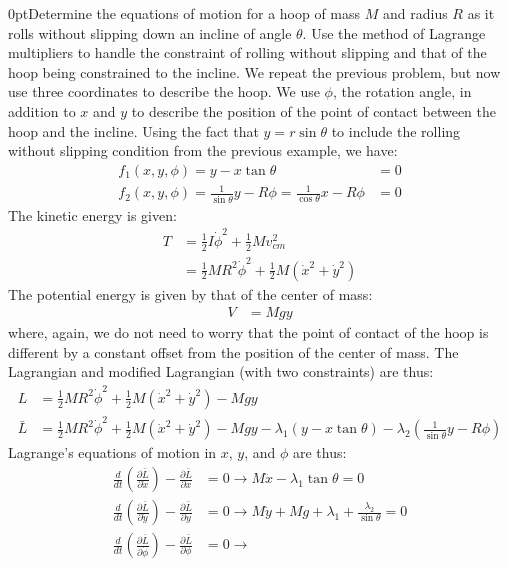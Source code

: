 \begin{example}{0pt}{Determine the equations of motion for a hoop of mass $M$ and radius $R$ as it rolls without slipping down an incline of angle $\theta$. Use the method of Lagrange multipliers to handle the constraint of rolling without slipping and that of the hoop being constrained to the incline.}{}
We repeat the previous problem, but now use three coordinates to describe the hoop. We use $\phi$, the rotation angle, in addition to $x$ and $y$ to describe the position of the point of contact between the hoop and the incline. Using the fact that $y=r\sin{\theta}$ to include the rolling without slipping condition from the previous example, we have:
\begin{align*}
f_1(x,y,\phi)=y-x\tan{\theta}&=0\\
f_2(x,y,\phi)=\frac{1}{\sin{\theta}}y-R\phi=\frac{1}{\cos{\theta}}x-R\phi&=0
\end{align*}
The kinetic energy is given:
\begin{align*}
T&=\frac{1}{2}I\dot{\phi}^2+\frac{1}{2}Mv_{cm}^2\\
&=\frac{1}{2}MR^2\dot{\phi}^2+\frac{1}{2}M(\dot{x}^2+\dot{y}^2)
\end{align*}
The potential energy is given by that of the center of mass:
\begin{align*}
V&=Mgy
\end{align*}
where, again, we do not need to worry that the point of contact of the hoop is different by a constant offset from the position of the center of mass. The Lagrangian and modified Lagrangian (with two constraints) are thus:
\begin{align*}
L&=\frac{1}{2}MR^2\dot{\phi}^2+\frac{1}{2}M(\dot{x}^2+\dot{y}^2)-Mgy\\
\bar{L}&=\frac{1}{2}MR^2\dot{\phi}^2+\frac{1}{2}M(\dot{x}^2+\dot{y}^2)-Mgy-\lambda_1(y-x\tan{\theta})-\lambda_2(\frac{1}{\sin{\theta}}y-R\phi)
\end{align*}
Lagrange's equations of motion in $x$, $y$, and $\phi$ are thus:
\begin{align*}
\frac{d}{dt}\left(\frac{\partial \bar{L}}{\partial \dot{x}} \right) - \frac{\partial \bar{L}}{\partial x}&=0\to
 M\ddot{x}-\lambda_1\tan{\theta}=0\\
\frac{d}{dt}\left(\frac{\partial \bar{L}}{\partial \dot{y}} \right) - \frac{\partial \bar{L}}{\partial y}&=0\to
 M\ddot{y}+Mg+\lambda_1+\frac{\lambda_2}{\sin{\theta}}=0\\
\frac{d}{dt}\left(\frac{\partial \bar{L}}{\partial \dot{\phi}} \right) - \frac{\partial \bar{L}}{\partial \phi}&=0\to

\end{align*}
\end{example}
